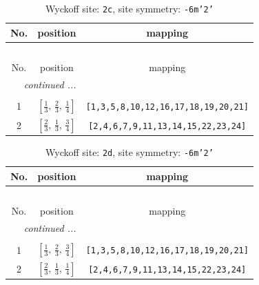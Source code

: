 \documentclass[fleqn,8pt]{jsarticle}
\begin{document}
\renewcommand{\arraystretch}{1.2}
\begin{longtable}{ccc}
\caption{Wyckoff site: {\tt 2c}, site symmetry: {\tt -6m'2'}}
 \\
 \hline \hline
No. & position & mapping \\ \hline \endfirsthead

\multicolumn{2}{l}{\tablename\ \thetable{}} \\
 \hline \hline
No. & position & mapping \\ \hline \endhead

 \hline \hline
\multicolumn{2}{r}{\footnotesize\it continued ...} \\ \endfoot

 \hline \hline
\multicolumn{2}{r}{} \\ \endlastfoot

1 & $\left[ \frac{1}{3},\, \frac{2}{3},\, \frac{1}{4} \right]$ & {\tt [1,3,5,8,10,12,16,17,18,19,20,21]} \\ \hline
2 & $\left[ \frac{2}{3},\, \frac{1}{3},\, \frac{3}{4} \right]$ & {\tt [2,4,6,7,9,11,13,14,15,22,23,24]} \\
\end{longtable}
\renewcommand{\arraystretch}{1.2}
\begin{longtable}{ccc}
\caption{Wyckoff site: {\tt 2d}, site symmetry: {\tt -6m'2'}}
 \\
 \hline \hline
No. & position & mapping \\ \hline \endfirsthead

\multicolumn{2}{l}{\tablename\ \thetable{}} \\
 \hline \hline
No. & position & mapping \\ \hline \endhead

 \hline \hline
\multicolumn{2}{r}{\footnotesize\it continued ...} \\ \endfoot

 \hline \hline
\multicolumn{2}{r}{} \\ \endlastfoot

1 & $\left[ \frac{1}{3},\, \frac{2}{3},\, \frac{3}{4} \right]$ & {\tt [1,3,5,8,10,12,16,17,18,19,20,21]} \\ \hline
2 & $\left[ \frac{2}{3},\, \frac{1}{3},\, \frac{1}{4} \right]$ & {\tt [2,4,6,7,9,11,13,14,15,22,23,24]} \\
\end{longtable}
\renewcommand{\arraystretch}{1.2}
\end{document}
